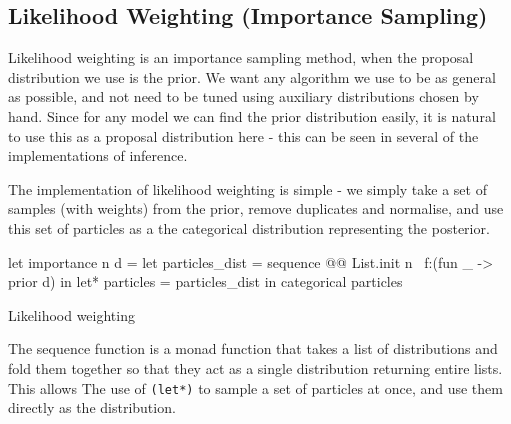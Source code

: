 \subsection{Likelihood Weighting (Importance Sampling)} \label{sec:likelihood-wighting}
		
Likelihood weighting is an importance sampling method, when the proposal distribution we use is the prior. We want any algorithm we use to be as general as possible, and not need to be tuned using auxiliary distributions chosen by hand. Since for any model we can find the prior distribution easily, it is natural to use this as a proposal distribution here - this can be seen in several of the implementations of inference. 
	
The implementation of likelihood weighting is simple - we simply take a set of samples (with weights) from the prior, remove duplicates and normalise, and use this set of particles as a the categorical distribution representing the posterior.
	\begin{listing}[!htb]
		\centering
		\begin{ocamlcode-in}
let importance n d = 
let particles_dist = sequence @@ List.init n ~f:(fun _ -> prior d) in
let* particles = particles_dist in 
categorical particles
		\end{ocamlcode-in}
		\caption{Likelihood weighting}
		\label{lst:imp}
	\end{listing}
	
The sequence function is a monad function that takes a list of distributions and fold them together so that they act as a single distribution returning entire lists. This allows The use of \texttt{(let*)} to sample a set of particles at once, and use them directly as the distribution.
	
